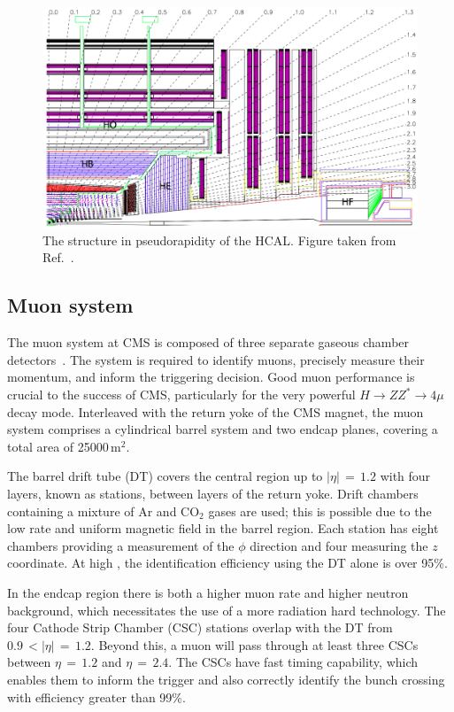 \begin{figure}[h!]
  \centering
  \includegraphics[width=\textwidth]{Figures/Detector/HCAL.png}
  \caption[The structure in pseudorapidity of the CMS HCAL.]
  {
    The structure in pseudorapidity of the HCAL.
    Figure taken from Ref.~\cite{CMSdetector}.
  }
  \label{fig:detector_HCAL}
\end{figure}

\subsection{Muon system}

The muon system at CMS is composed of three separate gaseous chamber detectors~\cite{CMSdetector,MuonReco}.
The system is required to identify muons, precisely measure their momentum, and inform the triggering decision.
Good muon performance is crucial to the success of CMS, particularly for the very powerful $H \rightarrow ZZ^* \rightarrow 4\mu$ decay mode.
Interleaved with the return yoke of the CMS magnet, the muon system comprises a cylindrical barrel system and two endcap planes, 
covering a total area of 25000\,$\textrm{m}^2$.

The barrel drift tube (DT) covers the central region up to $|\eta|\,=\,1.2$ with four layers, known as stations, between layers of the return yoke.
Drift chambers containing a mixture of Ar and $\textrm{CO}_2$ gases are used; this is possible due to the low rate and uniform magnetic field in the barrel region.
Each station has eight chambers providing a measurement of the $\phi$ direction and four measuring the $z$ coordinate.
At high \pt, the identification efficiency using the DT alone is over 95\%.

In the endcap region there is both a higher muon rate and higher neutron background, which necessitates the use of a more radiation hard technology. %
The four Cathode Strip Chamber (CSC) stations overlap with the DT from $0.9\,<|\eta|\,=\,1.2$.
Beyond this, a muon will pass through at least three CSCs between $\eta\,=\,1.2$ and $\eta\,=\,2.4$.
The CSCs have fast timing capability, which enables them to inform the trigger and also correctly identify the bunch crossing with efficiency greater than 99\%.

